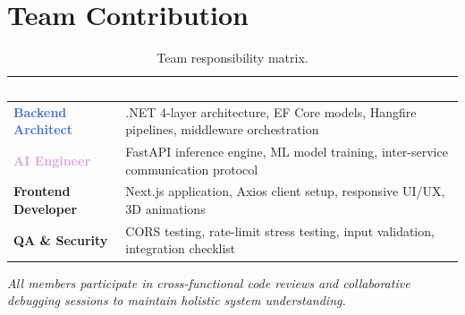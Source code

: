 \documentclass[12pt,a4paper]{article}
\begin{document}
\section{Team Contribution}

\begin{table}[H]
\centering \small
{}
\begin{tabularx}{0.95\textwidth}{l X}
\toprule
\rowcolor{sectionblue}\textcolor{white}{\textbf{Role}} & \textcolor{white}{\textbf{Responsibilities}} \\
\midrule
\textcolor{RoyalBlue}{\textbf{Backend Architect}} & .NET 4-layer architecture, EF Core models, Hangfire pipelines, middleware orchestration \\
\textcolor{Plum}{\textbf{AI Engineer}} & FastAPI inference engine, ML model training, inter-service communication protocol \\
\textcolor{accentcyan}{\textbf{Frontend Developer}} & Next.js application, Axios client setup, responsive UI/UX, 3D animations \\
\textcolor{successgreen}{\textbf{QA \& Security}} & CORS testing, rate-limit stress testing, input validation, integration checklist \\
\bottomrule
\end{tabularx}
\caption{Team responsibility matrix.}
\end{table}

\begin{center}
\small\itshape All members participate in cross-functional code reviews and collaborative debugging sessions to maintain holistic system understanding.
\end{center}
\end{document}
